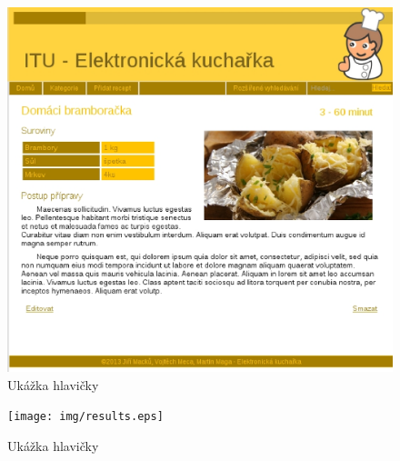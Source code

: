 \documentclass[12pt,a4paper,titlepage,final]{article}
\begin{document}
\begin{figure}

\begin{center}

\includegraphics[scale=0.7]{img/recept.eps} 
\caption{Ukážka hlavičky}


\end{center}

\end{figure}


\begin{figure}

\begin{center}

\texttt{[image: img/results.eps]} 
\caption{Ukážka hlavičky}


\end{center}

\end{figure}
\end{document}
